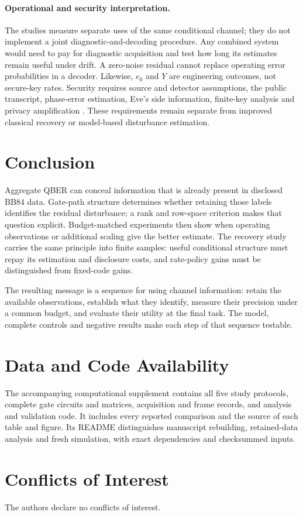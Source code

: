 \documentclass[manuscript,screen,review,anonymous]{acmart}
\begin{document}
\paragraph{Operational and security interpretation.}
The studies measure separate uses of the same conditional channel; they do
not implement a joint diagnostic-and-decoding procedure. Any combined
system would need to pay for diagnostic acquisition and test how long its
estimates remain useful under drift. A zero-noise residual cannot replace
operating error probabilities in a decoder.
Likewise, $e_0$ and $Y$ are engineering outcomes, not secure-key rates.
Security requires source and detector assumptions, the public transcript,
phase-error estimation, Eve's side information, finite-key analysis and
privacy amplification
\cite{gllp2004,scarani2009,xu2020,fung2009,tomamichel2012,rennerkoenig2005,shor2000}.
These requirements remain separate from improved classical recovery or
model-based disturbance estimation.

\section{Conclusion}
Aggregate QBER can conceal information that is already present in disclosed
BB84 data. Gate-path structure determines whether retaining those labels
identifies the residual disturbance; a rank and row-space criterion makes
that question explicit. Budget-matched experiments then show when operating
observations or additional scaling give the better estimate. The recovery
study carries the same principle into finite samples: useful conditional
structure must repay its estimation and disclosure costs, and rate-policy
gains must be distinguished from fixed-code gains.

The resulting message is a sequence for using channel information:
retain the available observations, establish what they identify, measure
their precision under a common budget, and evaluate their utility at the
final task. The model, complete controls and negative results make each
step of that sequence testable.
\section*{Data and Code Availability}
The accompanying computational supplement contains all five study protocols,
complete gate circuits and matrices, acquisition and frame records, and
analysis and validation code. It includes every reported comparison and the
source of each table and figure. Its README distinguishes manuscript rebuilding,
retained-data analysis and fresh simulation, with exact dependencies and
checksummed inputs.

\section*{Conflicts of Interest}
The authors declare no conflicts of interest.

\FloatBarrier
\clearpage


\FloatBarrier
\clearpage

\end{document}
